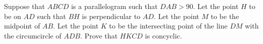 Suppose that $ABCD$ is a parallelogram such that $DAB>90$. Let the point $H$ to be on $AD$ such that $BH$ is perpendicular to $AD$. Let the point $M$ to be the midpoint of $AB$. Let the point $K$ to be the intersecting point of the line $DM$ with the circumcircle of $ADB$. Prove that $HKCD$ is concyclic.